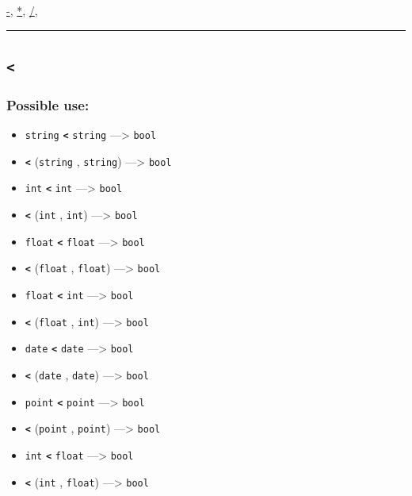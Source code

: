 \documentclass[]{book}
\providecommand{\tightlist}{%
  \setlength{\itemsep}{0pt}\setlength{\parskip}{0pt}}
\theoremstyle{definition}
\theoremstyle{definition}
\theoremstyle{definition}
\theoremstyle{remark}
\begin{document}
\href{operators-a-to-a.html\#-}{-}, \href{operators-a-to-a.html\#*}{*},
\href{operators-a-to-a.html\#/}{/},

\begin{center}\rule{0.5\linewidth}{\linethickness}\end{center}

\subsection{\texorpdfstring{\texttt{\textless{}}}{\textless{}}}\label{section-12}

\subsubsection{Possible use:}\label{possible-use-11}

\begin{itemize}
\tightlist
\item
  \texttt{string} \textbf{\texttt{\textless{}}} \texttt{string}
  ---\textgreater{} \texttt{bool}
\item
  \textbf{\texttt{\textless{}}} (\texttt{string} , \texttt{string})
  ---\textgreater{} \texttt{bool}
\item
  \texttt{int} \textbf{\texttt{\textless{}}} \texttt{int}
  ---\textgreater{} \texttt{bool}
\item
  \textbf{\texttt{\textless{}}} (\texttt{int} , \texttt{int})
  ---\textgreater{} \texttt{bool}
\item
  \texttt{float} \textbf{\texttt{\textless{}}} \texttt{float}
  ---\textgreater{} \texttt{bool}
\item
  \textbf{\texttt{\textless{}}} (\texttt{float} , \texttt{float})
  ---\textgreater{} \texttt{bool}
\item
  \texttt{float} \textbf{\texttt{\textless{}}} \texttt{int}
  ---\textgreater{} \texttt{bool}
\item
  \textbf{\texttt{\textless{}}} (\texttt{float} , \texttt{int})
  ---\textgreater{} \texttt{bool}
\item
  \texttt{date} \textbf{\texttt{\textless{}}} \texttt{date}
  ---\textgreater{} \texttt{bool}
\item
  \textbf{\texttt{\textless{}}} (\texttt{date} , \texttt{date})
  ---\textgreater{} \texttt{bool}
\item
  \texttt{point} \textbf{\texttt{\textless{}}} \texttt{point}
  ---\textgreater{} \texttt{bool}
\item
  \textbf{\texttt{\textless{}}} (\texttt{point} , \texttt{point})
  ---\textgreater{} \texttt{bool}
\item
  \texttt{int} \textbf{\texttt{\textless{}}} \texttt{float}
  ---\textgreater{} \texttt{bool}
\item
  \textbf{\texttt{\textless{}}} (\texttt{int} , \texttt{float})
  ---\textgreater{} \texttt{bool}
\end{itemize}
\end{document}
